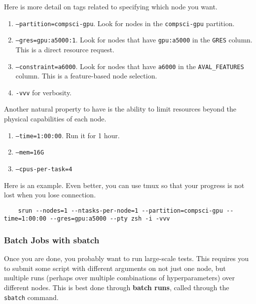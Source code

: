   \begin{definition}
    Here is more detail on tags related to specifying which node you want. 
    \begin{enumerate}
      \item \texttt{--partition=compsci-gpu}. Look for nodes in the \texttt{compsci-gpu} partition. 
      \item \texttt{--gres=gpu:a5000:1}. Look for nodes that have \texttt{gpu:a5000} in the \texttt{GRES} column. This is a direct resource request. 
      \item \texttt{--constraint=a6000}. Look for nodes that have \texttt{a6000} in the \texttt{AVAL\_FEATURES} column. This is a feature-based node selection. 
      \item \texttt{-vvv} for verbosity. 
    \end{enumerate} 
  \end{definition} 


  \begin{definition}
    Another natural property to have is the ability to limit resources beyond the physical capabilities of each node. 
    \begin{enumerate}
      \item \texttt{--time=1:00:00}. Run it for 1 hour.  
      \item \texttt{--mem=16G} 
      \item \texttt{--cpus-per-task=4}
    \end{enumerate}
  \end{definition}

  Here is an example. Even better, you can use tmux so that your progress is not lost when you lose connection. 
  \begin{lstlisting}
    srun --nodes=1 --ntasks-per-node=1 --partition=compsci-gpu --time=1:00:00 --gres=gpu:a5000 --pty zsh -i -vvv
  \end{lstlisting}

\subsubsection{Batch Jobs with sbatch}

  Once you are done, you probably want to run large-scale tests. This requires you to submit some script with different arguments on not just one node, but multiple runs (perhaps over multiple combinations of hyperparameters) over different nodes. This is best done through \textbf{batch runs}, called through the \texttt{sbatch} command. 

